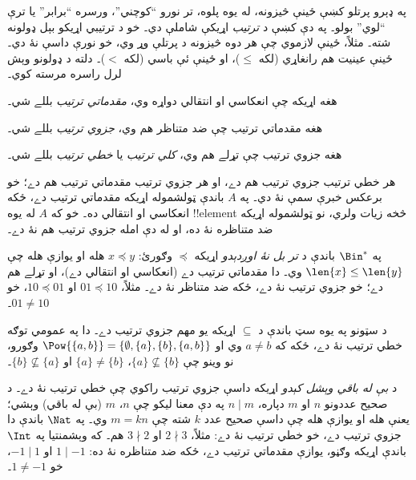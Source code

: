\documentclass[../../../include/open-logic-section]{subfiles}
\begin{document}

\begin{explain}
په ډېرو پرتلو کښې ځينې څيزونه، له يوه پلوه، تر نورو ``کوچني''،
ورسره ``برابر'' يا ترې ``لوي'' بولو۔ په دې کښې د \emph{ترتيب}
اړيکې شاملې دي۔ خو د ترتيبي اړيکو بېل ډولونه شته۔ مثلاً، ځينې
لازموي چې هر دوه څيزونه د پرتلې وړ وي، خو نورې داسې نۀ دي۔ ځينې
عينيت هم رانغاړي (لکه $\le$)، او ځينې ئې باسي (لکه $<$)۔ دلته د
ډولونو وېش لرل راسره مرسته کوي۔
\end{explain}

\begin{defn}
هغه اړيکه چې انعکاسي او انتقالي دواړه وي، \emph{مقدماتي ترتيب}
بللے شي۔
\end{defn}

\begin{defn}
هغه مقدماتي ترتيب چې ضد متناظر هم وي، \emph{جزوي ترتيب} بللے شي۔
\end{defn}

\begin{defn}
هغه جزوي ترتيب چې تړلے هم وي، \emph{کلي ترتيب} يا \emph{خطي ترتيب}
بللے شي۔
\end{defn}

\begin{ex}
هر خطي ترتيب جزوي ترتيب هم دے، او هر جزوي ترتيب مقدماتي ترتيب
هم دے؛ خو برعکس خبرې سمې نۀ دي۔ په $A$ باندې ټولشموله اړيکه
مقدماتي ترتيب دے، ځکه انعکاسي او انتقالي ده۔ خو که $A$ له يوه
!!{element} څخه زيات ولري، نو ټولشموله اړيکه ضد متناظره نۀ ده،
او له دې امله جزوي ترتيب هم نۀ دے۔
\end{ex}

\begin{ex}
په $\Bin^*$ باندې د \emph{تر بل نۀ اوږدېدو} اړيکه
$\preccurlyeq$ وګورئ: $x \preccurlyeq y$ هله او يوازې هله چې
$\len{x} \le \len{y}$ وي۔ دا مقدماتي ترتيب دے (انعکاسي او انتقالي
دے)، او تړلے هم دے؛ خو جزوي ترتيب نۀ دے، ځکه ضد متناظر نۀ دے۔
مثلاً، $01 \preccurlyeq 10$ او $10 \preccurlyeq 01$، خو
$01 \neq 10$۔
\end{ex}

\begin{ex}
د سټونو په يوه سټ باندې د $\subseteq$ اړيکه يو مهم جزوي ترتيب دے۔
دا په عمومي توګه خطي ترتيب نۀ دے، ځکه که $a \neq b$ وي او
$\Pow{\{a, b\}} = \{\emptyset, \{a\}, \{b\}, \{a,b\}\}$
وګورو، نو وينو چې $\{a\} \nsubseteq \{b\}$،
$\{a\} \neq \{b\}$ او $\{b\} \nsubseteq \{a\}$۔
\end{ex}

\begin{ex}
د \emph{بې له باقي وېشل کېدو} اړيکه داسې جزوي ترتيب راکوي چې خطي
ترتيب نۀ دے۔ د صحيح عددونو $n$ او $m$ دپاره، $n \mid m$ په دې
معنا ليکو چې $n$، $m$ (بې له باقي) وېشي؛ يعنې هله او يوازې هله
چې داسې صحيح عدد $k$ شته چې $m = kn$ وي۔ په $\Nat$ باندې دا جزوي
ترتيب دے، خو خطي ترتيب نۀ دے: مثلاً، $2 \nmid 3$ او $3 \nmid 2$
هم۔ که وېشمنتيا په $\Int$ باندې اړيکه وګڼو، يوازې مقدماتي ترتيب
دے، ځکه ضد متناظره نۀ ده: $1 \mid -1$ او $-1 \mid 1$، خو
$1 \neq -1$۔
\end{ex}
\end{document}
